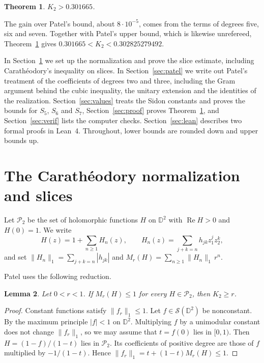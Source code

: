 \documentclass[11pt]{amsart}
\newtheorem{theorem}{Theorem}[section]
\newtheorem{lemma}[theorem]{Lemma}
\theoremstyle{remark}
\numberwithin{equation}{section}
\newcommand{\D}{\mathbb{D}}
\newcommand{\Pclass}{\mathcal{P}_2}
\newcommand{\Kbound}{0.301665}
\newcommand{\PatelUB}{0.302825279492}
\begin{document}
\begin{theorem}\label{thm:main}
$K_2>\Kbound$.
\end{theorem}

The gain over Patel's bound, about $8\cdot10^{-5}$, comes from the terms of degrees five, six and seven. Together with Patel's upper bound, which is likewise unrefereed, Theorem~\ref{thm:main} gives $\Kbound<K_2<\PatelUB$.

In Section~\ref{sec:setup} we set up the normalization and prove the slice estimate, including Carath\'eodory's inequality on slices. In Section~\ref{sec:patel} we write out Patel's treatment of the coefficients of degrees two and three, including the Gram argument behind the cubic inequality, the unitary extension and the identities of the realization. Section~\ref{sec:values} treats the Sidon constants and proves the bounds for $S_5$, $S_6$ and $S_7$, Section~\ref{sec:proof} proves Theorem~\ref{thm:main}, and Section~\ref{sec:verif} lists the computer checks. Section~\ref{sec:lean} describes two formal proofs in Lean~4. Throughout, lower bounds are rounded down and upper bounds up.

\section{The Carath\'eodory normalization and slices}\label{sec:setup}

Let $\Pclass$ be the set of holomorphic functions $H$ on $\D^2$ with $\operatorname{Re}H>0$ and $H(0)=1$. We write
\[
H(z)=1+\sum_{n\ge1}H_n(z),\qquad H_n(z)=\sum_{j+k=n}h_{jk}z_1^jz_2^k,
\]
and set $\|H_n\|_1=\sum_{j+k=n}|h_{jk}|$ and $M_r(H)=\sum_{n\ge1}\|H_n\|_1\,r^n$.

Patel \cite{PatMDB} uses the following reduction.

\begin{lemma}\label{lem:norm}
Let $0<r<1$. If $M_r(H)\le1$ for every $H\in\Pclass$, then $K_2\ge r$.
\end{lemma}

\begin{proof}
Constant functions satisfy $\|f_r\|_1\le1$. Let $f\in\mathcal S(\D^2)$ be nonconstant. By the maximum principle $|f|<1$ on $\D^2$. Multiplying $f$ by a unimodular constant does not change $\|f_r\|_1$, so we may assume that $t=f(0)$ lies in $[0,1)$. Then $H=(1-f)/(1-t)$ lies in $\Pclass$. Its coefficients of positive degree are those of $f$ multiplied by $-1/(1-t)$. Hence $\|f_r\|_1=t+(1-t)M_r(H)\le1$.
\end{proof}
\end{document}
